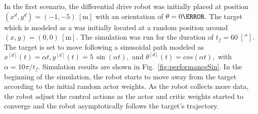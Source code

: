 \documentclass[conference]{IEEEtran}
\begin{document}
 
 In the first scenario, the differential drive robot was initially placed at position $(x^d,y^d) = (-1,-5)~[\si{\meter}] $ with an orientation of $\theta = 0\degree.$ The target which is modeled as a  was initially located at a random position around  $(x,y) = (0,0)~[\si{\meter}].$ The simulation was run for the duration of $t_f=60~[\second].$ The target is set to move following a sinusoidal path modeled as  $
 x^{[d]}(t) = \alpha t, %
 y^{[d]}(t) = 5 \,\sin(\alpha t),$  and %
 $\theta^{[d]}(t) = cos(\alpha t),
 $ with $\alpha = 10\pi/t_f.$ Simulation results are shown in Fig.~\ref{fig:performanceSin}. In the beginning of the simulation, the robot starts to move away from the target according to the initial random actor weights. As the robot collects more data, the robot adjust the control actions as the actor and critic weights started to converge and the robot asymptotically follows the target's trajectory. %
%
\end{document}
